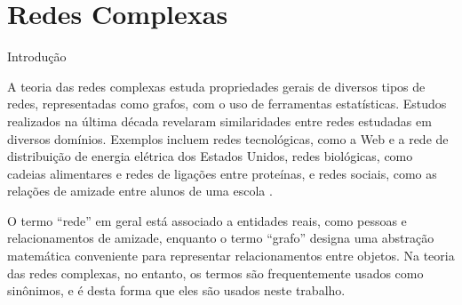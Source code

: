 
\newcommand{\din}[0]{\ensuremath{\delta_{in}}}
\newcommand{\dout}[0]{\ensuremath{\delta_{out}}}
\newcommand{\gin}[0]{\ensuremath{\mathrm{g}_{in}}}
\newcommand{\gout}[0]{\ensuremath{\mathrm{g}_{out}}}

\chapter{Redes Complexas} \label{cap:redes} 

\begin{section}{Introdução} \label{sec:redes-complexas} %


A teoria das redes complexas estuda propriedades gerais de diversos tipos de redes, representadas como grafos, com o uso de ferramentas estatísticas. Estudos realizados na última década revelaram similaridades entre redes estudadas em diversos domínios. Exemplos incluem redes tecnológicas, como a Web e a rede de distribuição de energia elétrica dos Estados Unidos, redes biológicas, como cadeias alimentares e redes de ligações entre proteínas, e redes sociais, como as relações de amizade entre alunos de uma escola \cite{Newman2003}.

O termo ``rede'' em geral está associado a entidades reais, como pessoas e relacionamentos de amizade, enquanto o termo ``grafo'' designa uma abstração matemática conveniente para representar relacionamentos entre objetos. Na teoria das redes complexas, no entanto, os termos são frequentemente usados como sinônimos, e é desta forma que eles são usados neste trabalho.
\end{section}

